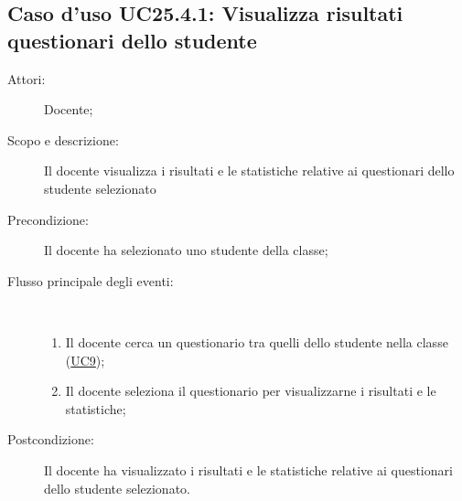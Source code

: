 \subsection{Caso d'uso UC25.4.1: Visualizza risultati questionari dello studente}\begin{description}
	\item[Attori:] Docente;
	\item[Scopo e descrizione:] Il docente visualizza i risultati e le statistiche relative ai questionari dello studente selezionato
	\item[Precondizione:] Il docente ha selezionato uno studente della classe;
	
	\item[Flusso principale degli eventi:] \ 
	\begin{enumerate}
		\item Il docente cerca un questionario tra quelli dello studente nella classe (\hyperlink{UC9}{UC9});
		\item Il docente seleziona il questionario per visualizzarne i risultati e le statistiche;
		
	\end{enumerate}
	\item[Postcondizione:] Il docente ha visualizzato i risultati e le statistiche relative ai questionari dello studente selezionato.
\end{description}
\hypertarget{UC26}{}
